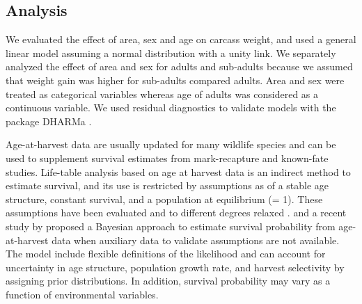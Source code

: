 \documentclass[PCJ,Unicode,screen]{cedram}
\begin{document}


\subsection*{Analysis}

We evaluated the effect of area, sex and age on carcass weight, and used a general linear model assuming a normal distribution with a unity link. We separately analyzed the effect of area and sex for adults and sub-adults because we assumed that weight gain was higher for sub-adults compared adults. Area and sex were treated as categorical variables whereas age of adults was considered as a continuous variable. We used residual diagnostics to validate models with the package DHARMa \citep{hartigDHARMaResidualDiagnostics2022}.

Age-at-harvest data are usually updated for many wildlife species and can be used to supplement survival estimates from mark-recapture and known-fate studies. Life-table analysis based on age at harvest data is an indirect method to estimate survival, and its use is restricted by assumptions as of a stable age structure, constant survival, and a population at equilibrium (\lambda = 1). These assumptions have been evaluated and to different degrees relaxed \citep{udevitzEstimatingSurvivalRates1998}. and a recent study by \citet{skellyFlexibleBayesianApproach} proposed a Bayesian approach to estimate survival probability from age-at-harvest data when auxiliary data to validate assumptions are not available. The model include flexible definitions of the likelihood and can account for uncertainty in age structure, population growth rate, and harvest selectivity by assigning prior distributions. In addition,  survival probability may vary as a function of environmental variables. 
\end{document}
